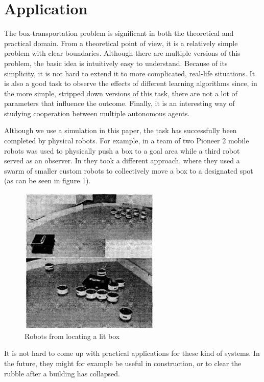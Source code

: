 \section{Application}
The box-transportation problem is significant in both the theoretical and practical domain. From a theoretical point of view, it is a relatively simple problem with clear boundaries. Although there are multiple versions of this problem, the basic idea is intuitively easy to understand. Because of its simplicity, it is not hard to extend it to more complicated, real-life situations. It is also a good task to observe the effects of different learning algorithms since, in the more simple, stripped down versions of this task, there are not a lot of parameters that influence the outcome. Finally, it is an interesting way of studying cooperation between multiple autonomous agents.

 Although we use a simulation in this paper, the task has successfully been completed by physical robots. For example, in \cite{mataric2002} a team of two Pioneer 2 mobile robots was used to physically push a box to a goal area while a third robot served as an observer. In \cite{kube1996} they took a different approach, where they used a swarm of smaller custom robots to collectively move a box to a designated spot (as can be seen in figure 1).
\begin{figure}[H]
\begin{center}
\caption{Robots from \cite{kube1996} locating a lit box}
\includegraphics[width = 0.6\textwidth]{images/swarmPushing.png}
\end{center}
\end{figure}
It is not hard to come up with practical applications for these kind of systems. In the future, they might for example be useful in construction, or to clear the rubble after a building has collapsed.\\
